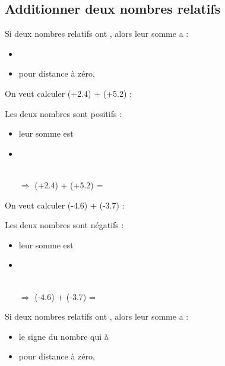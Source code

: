 \subsection{Additionner deux nombres relatifs}

\begin{myprop}
	Si deux nombres relatifs ont , alors leur somme a :
	\begin{itemize}
		\item %
		\item pour distance à zéro, %
	\end{itemize}
\end{myprop}

\begin{myexs}
	\begin{multicols}{2}
		On veut calculer (+\num{2.4}) + (+\num{5.2}) :
		
		Les deux nombres sont positifs :
		\begin{itemize}
			\item leur somme est %
			\item \ %
			\\ \ %
			\item[$\Rightarrow$] (+\num{2.4}) + (+\num{5.2}) = %
		\end{itemize} 
		
		
		On veut calculer (-\num{4.6}) + (-\num{3.7}) :
		
		Les deux nombres sont négatifs :
		\begin{itemize}
			\item leur somme est %
			\item \ %
			\\ \ %
			\item[$\Rightarrow$] (-\num{4.6}) + (-\num{3.7}) = %
		\end{itemize} 
	\end{multicols}
\end{myexs}

\begin{myprop}
	Si deux nombres relatifs ont , alors leur somme a :
	\begin{itemize}
		\item le signe du nombre qui à %
		\item pour distance à zéro, %
	\end{itemize}
\end{myprop}

